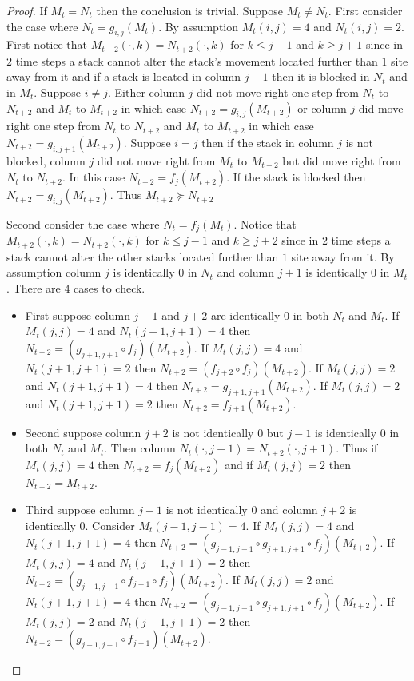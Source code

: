 \documentclass[reqno]{amsart}
\begin{document}
\begin{proof}
    If $M_t = N_t$ then the conclusion is trivial. Suppose $M_t \neq N_t$. First consider the case where $N_t = g_{i,j}(M_t)$. By assumption $M_t(i,j)=4$ and $N_t(i,j)=2$. First notice that $M_{t+2}(\cdot, k) = N_{t+2}(\cdot, k)$ for $k\leq j-1$ and $k \geq j+1$ since in $2$ time steps a stack cannot alter the stack's movement located further than $1$ site away from it and if a stack is located in column $j-1$ then it is blocked in $N_t$ and in $M_t$. Suppose $i \neq j$. Either column $j$ did not move right one step from $N_t$ to $N_{t+2}$ and $M_t$ to $M_{t+2}$ in which case $N_{t+2} = g_{i,j}(M_{t+2})$ or column $j$ did move right one step from $N_t$ to $N_{t+2}$ and $M_t$ to $M_{t+2}$ in which case $N_{t+2} = g_{i,j+1}(M_{t+2})$. Suppose $i=j$ then if the stack in column $j$ is not blocked, column $j$ did not move right from $M_t$ to $M_{t+2}$ but did move right from $N_t$ to $N_{t+2}$. In this case $N_{t+2} = f_j(M_{t+2})$. If the stack is blocked then $N_{t+2} = g_{i,j}(M_{t+2})$. Thus $M_{t+2} \succeq N_{t+2}$

    Second consider the case where $N_t = f_j(M_t)$. Notice that $M_{t+2}(\cdot, k) = N_{t+2}(\cdot, k)$ for $k\leq j-1$ and $k \geq j+2$ since in $2$ time steps a stack cannot alter the other stacks located further than $1$ site away from it. By assumption column $j$ is identically $0$ in $N_t$ and column $j+1$ is identically $0$ in $M_t$. There are $4$ cases to check.

    \begin{itemize}
        \item   First suppose column $j-1$ and $j+2$ are identically $0$ in both $N_t$ and $M_t$. If $M_t(j,j)=4$ and $N_t(j+1,j+1)=4$ then $N_{t+2} = (g_{j+1,j+1} \circ f_j )(M_{t+2})$. If $M_t(j,j)=4$ and $N_t(j+1,j+1)=2$ then $N_{t+2} = (f_{j+2} \circ f_j)(M_{t+2})$. If $M_t(j,j)=2$ and $N_t(j+1,j+1)=4$ then $N_{t+2} = g_{j+1,j+1}(M_{t+2})$. If $M_t(j,j)=2$ and $N_t(j+1,j+1)=2$ then $N_{t+2} = f_{j+1}(M_{t+2})$.
        \item     Second suppose column $j+2$ is not identically $0$ but $j-1$ is identically $0$ in both $N_t$ and $M_t$. Then column $N_t(\cdot, j+1) = N_{t+2}(\cdot, j+1)$. Thus if $M_t(j,j)=4$ then $N_{t+2} = f_j(M_{t+2})$ and if $M_t(j,j)=2$ then $N_{t+2} = M_{t+2}$.
        \item Third suppose column $j-1$ is not identically $0$ and column $j+2$ is identically $0$. Consider $M_t(j-1,j-1) = 4$.
        If $M_t(j,j) = 4$ and $N_t(j+1,j+1) = 4$ then $N_{t+2} = (g_{j-1,j-1} \circ g_{j+1,j+1} \circ f_j)(M_{t+2})$.
        If $M_t(j,j) = 4$ and $N_t(j+1,j+1) = 2$ then $N_{t+2} = (g_{j-1,j-1} \circ f_{j+1} \circ f_j) (M_{t+2})$.
        If $M_t(j,j) = 2$ and $N_t(j+1,j+1) = 4$  then $N_{t+2} = (g_{j-1,j-1} \circ g_{j+1,j+1} \circ f_j) (M_{t+2})$.
        If $M_t(j,j) = 2$ and $N_t(j+1,j+1) = 2$ then $N_{t+2} = (g_{j-1,j-1} \circ f_{j+1})(M_{t+2})$.


\end{itemize}
\end{proof}
\end{document}
